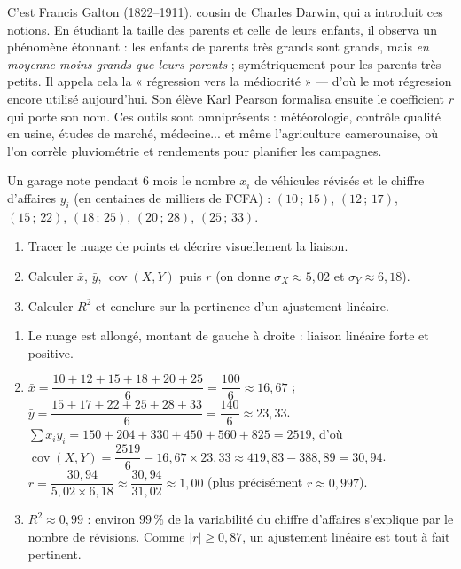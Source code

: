 \documentclass[11pt]{article}
\newcommand{\cle}[1]{{\popxbold\color{popdark}#1}}
\begin{document}
\begin{savaistu}
C'est Francis Galton (1822--1911), cousin de Charles Darwin, qui a introduit ces notions. En étudiant la taille des parents et celle de leurs enfants, il observa un phénomène étonnant : les enfants de parents très grands sont grands, mais \emph{en moyenne moins grands que leurs parents} ; symétriquement pour les parents très petits. Il appela cela la « régression vers la médiocrité » — d'où le mot \cle{régression} encore utilisé aujourd'hui. Son élève Karl Pearson formalisa ensuite le coefficient $r$ qui porte son nom. Ces outils sont omniprésents : météorologie, contrôle qualité en usine, études de marché, médecine... et même l'agriculture camerounaise, où l'on corrèle pluviométrie et rendements pour planifier les campagnes.
\end{savaistu}

\begin{exercice}
Un garage note pendant 6 mois le nombre $x_i$ de véhicules révisés et le chiffre d'affaires $y_i$ (en centaines de milliers de FCFA) : $(10\,;\,15)$, $(12\,;\,17)$, $(15\,;\,22)$, $(18\,;\,25)$, $(20\,;\,28)$, $(25\,;\,33)$.
\begin{enumerate}
\item Tracer le nuage de points et décrire visuellement la liaison.
\item Calculer $\bar{x}$, $\bar{y}$, $\operatorname{cov}(X,Y)$ puis $r$ (on donne $\sigma_X \approx 5{,}02$ et $\sigma_Y \approx 6{,}18$).
\item Calculer $R^2$ et conclure sur la pertinence d'un ajustement linéaire.
\end{enumerate}
\end{exercice}

\begin{corrige}
\begin{enumerate}
\item Le nuage est allongé, montant de gauche à droite : liaison linéaire forte et positive.
\item $\bar{x} = \dfrac{10+12+15+18+20+25}{6} = \dfrac{100}{6} \approx 16{,}67$ ; $\bar{y} = \dfrac{15+17+22+25+28+33}{6} = \dfrac{140}{6} \approx 23{,}33$.\\
$\sum x_i y_i = 150+204+330+450+560+825 = 2519$, d'où $\operatorname{cov}(X,Y) = \dfrac{2519}{6} - 16{,}67 \times 23{,}33 \approx 419{,}83 - 388{,}89 = 30{,}94$.\\
$r = \dfrac{30{,}94}{5{,}02 \times 6{,}18} \approx \dfrac{30{,}94}{31{,}02} \approx 1{,}00$ (plus précisément $r \approx 0{,}997$).
\item $R^2 \approx 0{,}99$ : environ $99\,\%$ de la variabilité du chiffre d'affaires s'explique par le nombre de révisions. Comme $|r| \geq 0{,}87$, un ajustement linéaire est tout à fait pertinent.
\end{enumerate}
\end{corrige}
\end{document}
